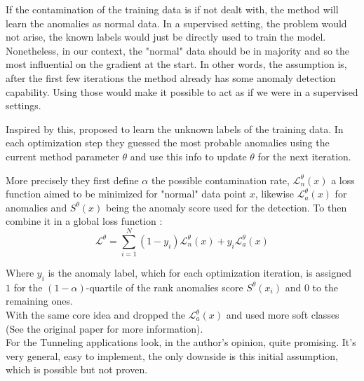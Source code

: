 \documentclass[../description.tex]{subfiles}
\begin{document}
    If the contamination of the training data is if not dealt with, the method will learn the anomalies as normal data.
    In a supervised setting, the problem would not arise, the known labels would just be directly used to train the model.
    Nonetheless, in our context, the "normal" data should be in majority and so the most influential on the gradient at the start.
    In other words, the assumption is, after the first few iterations the method already has some anomaly detection capability. 
    Using those would make it possible to act as if we were in a supervised settings. 

    Inspired by this, \cite{ChenQiu.2022} proposed to learn the unknown labels of the training data. 
    In each optimization step they guessed the most probable anomalies using the current method parameter $\theta$ and 
    use this info to update $\theta$ for the next iteration.

    More precisely they first define $\alpha$ the possible contamination rate, 
    $\mathcal{L}_n^\theta(x)$ a loss function aimed to be minimized for "normal" data point $x$,
    likewise $\mathcal{L}_a^\theta(x)$ for anomalies and $S^\theta(x)$ being the anomaly score used for the detection.
    To then combine it in a global loss function :
    \begin{equation}
        \mathcal{L}^\theta = \sum_{i=1}^{N} (1-y_i)\mathcal{L}_n^\theta(x) + y_i\mathcal{L}_a^\theta(x)
    \end{equation}

    Where $y_i$ is the anomaly label, which for each optimization iteration, is assigned $1$ for the $(1-\alpha)$-quartile
    of the rank anomalies score $S^\theta(x_i)$ and $0$ to the remaining ones.\\
    With the same core idea \cite{Kim.2023} and \cite{Shang.2023} dropped the $\mathcal{L}_a^\theta(x)$ and used more soft classes
    (See the original paper for more information).\\

    For the Tunneling applications look, in the author's opinion, quite promising. It's very general, easy to implement, 
    the only downside is this initial assumption, which is possible but not proven.
\end{document}
